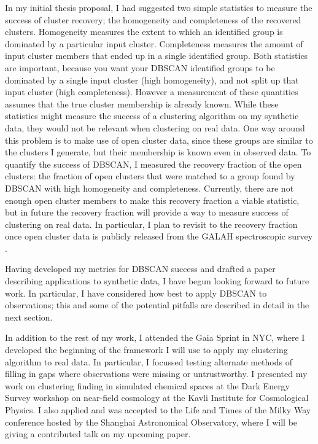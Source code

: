 \documentclass[11pt]{article}
\begin{document}
	In my initial thesis proposal, I had suggested two simple statistics to measure the success of cluster recovery; the homogeneity and completeness of the recovered clusters. Homogeneity measures the extent to which an identified group is dominated by a particular input cluster. Completeness measures the amount of input cluster members that ended up in a single identified group. Both statistics are important, because you want your DBSCAN identified groups to be dominated by a single input cluster (high homogeneity), and not split up that input cluster (high completeness). However a measurement of these quantities assumes that the true cluster membership is already known. While these statistics might measure the success of a clustering algorithm on my synthetic data, they would not be relevant when clustering on real data. One way around this problem is to make use of open cluster data, since these groups are similar to the clusters I generate, but their membership is known even in observed data. To quantify the success of DBSCAN, I measured the recovery fraction of the open clusters: the fraction of open clusters that were matched to a group found by DBSCAN with high homogeneity and completeness. Currently, there are not enough open cluster members to make this recovery fraction a viable statistic, but in future the recovery fraction will provide a way to measure success of clustering on real data. In particular, I plan to revisit to the recovery fraction once open cluster data is publicly released from the GALAH spectroscopic survey \citep{galah}.
	
	Having developed my metrics for DBSCAN success and drafted a paper describing applications to synthetic data, I have begun looking forward to future work. In particular, I have considered how best to apply DBSCAN to observations; this and some of the potential pitfalls are described in detail in the next section.
    
    In addition to the rest of my work, I attended the Gaia Sprint in NYC, where I developed the beginning of the framework I will use to apply my clustering algorithm to real data. In particular, I focussed testing alternate methods of filling in gaps where observations were missing or untrustworthy. I presented my work on clustering finding in simulated chemical spaces at the Dark Energy Survey workshop on near-field cosmology at the Kavli Institute for Cosmological Physics. I also applied and was accepted to the Life and Times of the Milky Way conference hosted by the Shanghai Astronomical Observatory, where I will be giving a contributed talk on my upcoming paper.
  
\end{document}
